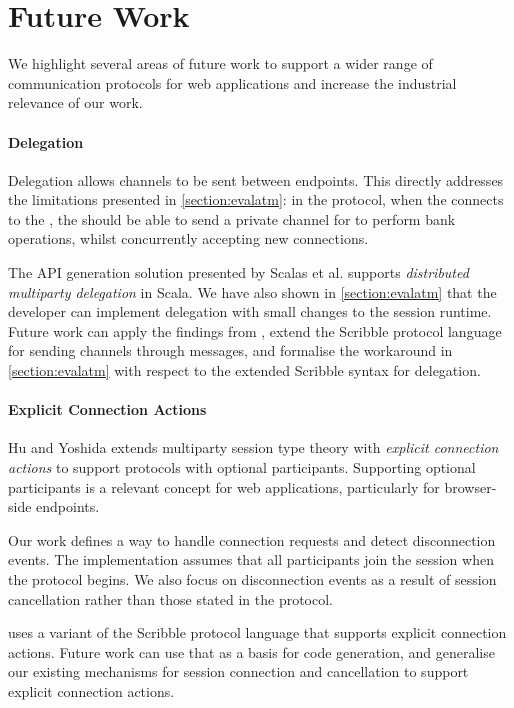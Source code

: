 \section{Future Work}

We highlight several areas of future work
to support a wider range of communication protocols
for web applications and increase the 
industrial relevance of our work.

\paragraph{Delegation}
Delegation allows channels to be sent between endpoints.
This directly addresses the limitations presented in
\cref{section:evalatm}: in the  protocol,
when the 
connects to the ,
the  should be able to send a private channel
for  to perform bank operations,
whilst concurrently accepting new connections.

The API generation solution 
presented by Scalas et al. \cite{LinearDecomp} supports
\textit{distributed multiparty delegation} in Scala.
We have also shown in \cref{section:evalatm} that
the developer can implement delegation with small changes
to the session runtime.
Future work can apply the findings from \cite{LinearDecomp},
extend the Scribble protocol language for sending
channels through messages, and formalise the workaround
in \cref{section:evalatm} with respect to the extended 
Scribble syntax for delegation.

\paragraph{Explicit Connection Actions}
Hu and Yoshida \cite{ExplicitConnections} extends 
multiparty session type theory
with \textit{explicit connection actions} to support protocols 
with optional participants.
Supporting optional participants is a relevant concept
for web applications, particularly for browser-side endpoints.

Our work defines a way to handle connection requests
and detect disconnection events. The implementation assumes that
all participants join the session when the protocol begins.
We also focus on disconnection events as a result of session
cancellation rather than those stated in the protocol.

\cite{ExplicitConnections} uses a variant of the Scribble protocol
language that supports explicit connection actions. Future work
can use that as a basis for code generation, and generalise
our existing mechanisms for session connection and cancellation
to support explicit connection actions.

